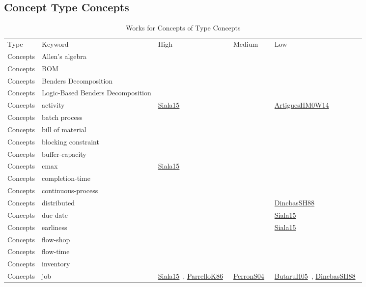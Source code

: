 \clearpage
\subsection{Concept Type Concepts}
\label{sec:Concepts}
{\scriptsize
\begin{longtable}{lp{3cm}>{\raggedright\arraybackslash}p{6cm}>{\raggedright\arraybackslash}p{6cm}>{\raggedright\arraybackslash}p{8cm}}
\rowcolor{white}\caption{Works for Concepts of Type Concepts}\\ \toprule
\rowcolor{white}Type & Keyword & High & Medium & Low\\ \midrule\endhead
\bottomrule
\endfoot
Concepts & Allen's algebra &  &  & \\
Concepts & BOM &  &  & \\
Concepts & Benders Decomposition &  &  & \\
Concepts & Logic-Based Benders Decomposition &  &  & \\
Concepts & activity & \href{cars/works/Siala15.pdf}{Siala15}~\cite{Siala15} &  & \href{cars/works/ArtiguesHM0W14.pdf}{ArtiguesHM0W14}~\cite{ArtiguesHM0W14}\\
Concepts & batch process &  &  & \\
Concepts & bill of material &  &  & \\
Concepts & blocking constraint &  &  & \\
Concepts & buffer-capacity &  &  & \\
Concepts & cmax & \href{cars/works/Siala15.pdf}{Siala15}~\cite{Siala15} &  & \\
Concepts & completion-time &  &  & \\
Concepts & continuous-process &  &  & \\
Concepts & distributed &  &  & \href{cars/works/DincbasSH88.pdf}{DincbasSH88}~\cite{DincbasSH88}\\
Concepts & due-date &  &  & \href{cars/works/Siala15.pdf}{Siala15}~\cite{Siala15}\\
Concepts & earliness &  &  & \href{cars/works/Siala15.pdf}{Siala15}~\cite{Siala15}\\
Concepts & flow-shop &  &  & \\
Concepts & flow-time &  &  & \\
Concepts & inventory &  &  & \\
Concepts & job & \href{cars/works/Siala15.pdf}{Siala15}~\cite{Siala15}, \href{cars/works/ParrelloK86.pdf}{ParrelloK86}~\cite{ParrelloK86} & \href{cars/works/PerronS04.pdf}{PerronS04}~\cite{PerronS04} & \href{cars/works/ButaruH05.pdf}{ButaruH05}~\cite{ButaruH05}, \href{cars/works/DincbasSH88.pdf}{DincbasSH88}~\cite{DincbasSH88}\\

\end{longtable}}
